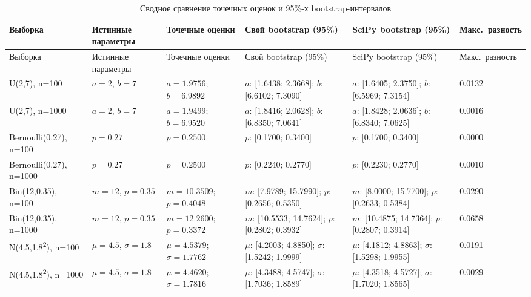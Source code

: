 \begin{longtable}{p{2.5cm} p{2.1cm} p{2.7cm} p{3.2cm} p{3.2cm} p{1.5cm}}
\caption{Сводное сравнение точечных оценок и 95\%-х bootstrap-интервалов}\label{tab:summary_bootstrap}\\
\toprule
Выборка & Истинные параметры & Точечные оценки & Свой bootstrap (95\%) & SciPy bootstrap (95\%) & Макс.\ разность \\
\midrule
\endfirsthead
\toprule
Выборка & Истинные параметры & Точечные оценки & Свой bootstrap (95\%) & SciPy bootstrap (95\%) & Макс.\ разность \\
\midrule
\endhead
\bottomrule
\endfoot
U(2,7), n=100 &
$a=2$, $b=7$ &
$a=1.9756$; $b=6.9892$ &
$a$: [1.6438; 2.3668]; $b$: [6.6102; 7.3090] &
$a$: [1.6405; 2.3750]; $b$: [6.5969; 7.3154] &
0.0132 \\
U(2,7), n=1000 &
$a=2$, $b=7$ &
$a=1.9499$; $b=6.9520$ &
$a$: [1.8416; 2.0628]; $b$: [6.8350; 7.0641] &
$a$: [1.8428; 2.0636]; $b$: [6.8340; 7.0625] &
0.0016 \\
Bernoulli(0.27), n=100 &
$p=0.27$ &
$p=0.2500$ &
$p$: [0.1700; 0.3400] &
$p$: [0.1700; 0.3400] &
0.0000 \\
Bernoulli(0.27), n=1000 &
$p=0.27$ &
$p=0.2500$ &
$p$: [0.2240; 0.2770] &
$p$: [0.2230; 0.2770] &
0.0010 \\
Bin(12,0.35), n=100 &
$m=12$, $p=0.35$ &
$m=10.3509$; $p=0.4048$ &
$m$: [7.9789; 15.7990]; $p$: [0.2656; 0.5350] &
$m$: [8.0000; 15.7700]; $p$: [0.2633; 0.5384] &
0.0290 \\
Bin(12,0.35), n=1000 &
$m=12$, $p=0.35$ &
$m=12.2600$; $p=0.3372$ &
$m$: [10.5533; 14.7624]; $p$: [0.2802; 0.3932] &
$m$: [10.4875; 14.7364]; $p$: [0.2807; 0.3914] &
0.0658 \\
N(4.5,1.8\textsuperscript{2}), n=100 &
$\mu=4.5$, $\sigma=1.8$ &
$\mu=4.5379$; $\sigma=1.7762$ &
$\mu$: [4.2003; 4.8850]; $\sigma$: [1.5242; 1.9999] &
$\mu$: [4.1812; 4.8863]; $\sigma$: [1.5298; 1.9955] &
0.0191 \\
N(4.5,1.8\textsuperscript{2}), n=1000 &
$\mu=4.5$, $\sigma=1.8$ &
$\mu=4.4620$; $\sigma=1.7816$ &
$\mu$: [4.3488; 4.5747]; $\sigma$: [1.7036; 1.8589] &
$\mu$: [4.3518; 4.5727]; $\sigma$: [1.7020; 1.8565] &
0.0029 \\
\end{longtable}
